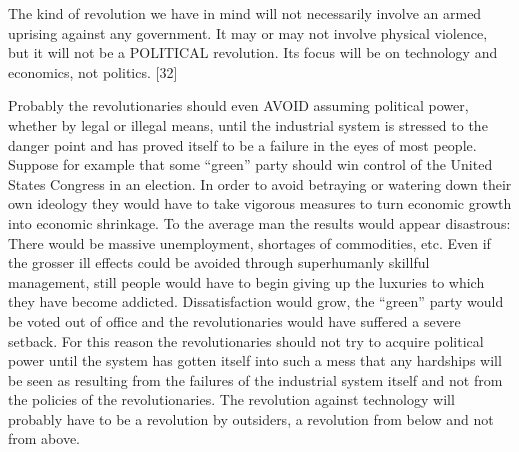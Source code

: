  The kind of revolution we have in mind will not necessarily involve an armed uprising against any government. It may or may not involve physical violence, but it will not be a POLITICAL revolution. Its focus will be on technology and economics, not politics. [32]

 Probably the revolutionaries should even AVOID assuming political power, whether by legal or illegal means, until the industrial system is stressed to the danger point and has proved itself to be a failure in the eyes of most people. Suppose for example that some “green” party should win control of the United States Congress in an election. In order to avoid betraying or watering down their own ideology they would have to take vigorous measures to turn economic growth into economic shrinkage. To the average man the results would appear disastrous: There would be massive unemployment, shortages of commodities, etc. Even if the grosser ill effects could be avoided through superhumanly skillful management, still people would have to begin giving up the luxuries to which they have become addicted. Dissatisfaction would grow, the “green” party would be voted out of office and the revolutionaries would have suffered a severe setback. For this reason the revolutionaries should not try to acquire political power until the system has gotten itself into such a mess that any hardships will be seen as resulting from the failures of the industrial system itself and not from the policies of the revolutionaries. The revolution against technology will probably have to be a revolution by outsiders, a revolution from below and not from above.

